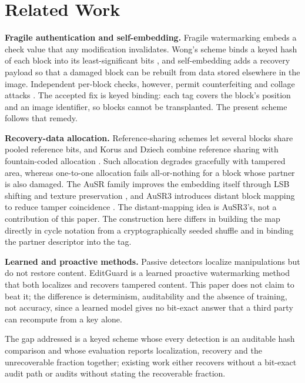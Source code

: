 \section{Related Work}

\textbf{Fragile authentication and self-embedding.} Fragile watermarking embeds a check value that any modification invalidates. Wong's scheme binds a keyed hash of each block into its least-significant bits \cite{wong2001secret}, and self-embedding \cite{fridrich1999selfembedding} adds a recovery payload so that a damaged block can be rebuilt from data stored elsewhere in the image. Independent per-block checks, however, permit counterfeiting and collage attacks \cite{holliman2000counterfeiting,fridrich2002security}. The accepted fix is keyed binding: each tag covers the block's position and an image identifier, so blocks cannot be transplanted. The present scheme follows that remedy.

\textbf{Recovery-data allocation.} Reference-sharing schemes \cite{zhang2008fragile,zhang2011reference} let several blocks share pooled reference bits, and Korus and Dziech combine reference sharing with fountain-coded allocation \cite{korus2013efficient}. Such allocation degrades gracefully with tampered area, whereas one-to-one allocation fails all-or-nothing for a block whose partner is also damaged. The AuSR family improves the embedding itself through LSB shifting and texture preservation \cite{ausr1}, and AuSR3 introduces distant block mapping to reduce tamper coincidence \cite{ausr3}. The distant-mapping idea is AuSR3's, not a contribution of this paper. The construction here differs in building the map directly in cycle notation from a cryptographically seeded shuffle and in binding the partner descriptor into the tag.

\textbf{Learned and proactive methods.} Passive detectors \cite{zhou2018learning,wu2019mantranet} localize manipulations but do not restore content. EditGuard \cite{editguard} is a learned proactive watermarking method that both localizes and recovers tampered content. This paper does not claim to beat it; the difference is determinism, auditability and the absence of training, not accuracy, since a learned model gives no bit-exact answer that a third party can recompute from a key alone.

The gap addressed is a keyed scheme whose every detection is an auditable hash comparison and whose evaluation reports localization, recovery and the unrecoverable fraction together; existing work either recovers without a bit-exact audit path or audits without stating the recoverable fraction.
